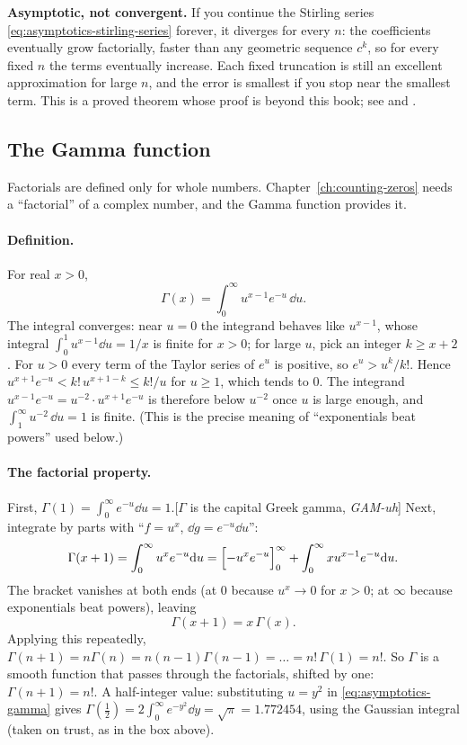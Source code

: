 \begin{beyond}
\textbf{Asymptotic, not convergent.} If you continue the Stirling series \cref{eq:asymptotics-stirling-series} forever, it diverges for every $n$: the coefficients eventually grow factorially, faster than any geometric sequence $c^k$, so for every fixed $n$ the terms eventually increase. Each fixed truncation is still an excellent approximation for large $n$, and the error is smallest if you stop near the smallest term. This is a proved theorem whose proof is beyond this book; see \cite{edwards} and \cite{rhb}.
\end{beyond}

\subsection{The Gamma function}

Factorials are defined only for whole numbers. Chapter~\ref{ch:counting-zeros} needs a ``factorial'' of a complex number, and the Gamma function provides it.

\paragraph{Definition.} For real $x>0$,
\begin{equation}
\Gamma(x)=\int_0^\infty u^{x-1}e^{-u}\,\dd u .
\label{eq:asymptotics-gamma}
\end{equation}
The integral converges: near $u=0$ the integrand behaves like $u^{x-1}$, whose integral $\int_0^1u^{x-1}\dd u=1/x$ is finite for $x>0$; for large $u$, pick an integer $k\ge x+2$. For $u>0$ every term of the Taylor series of $e^u$ is positive, so $e^u>u^k/k!$. Hence $u^{x+1}e^{-u}<k!\,u^{x+1-k}\le k!/u$ for $u\ge1$, which tends to $0$. The integrand $u^{x-1}e^{-u}=u^{-2}\cdot u^{x+1}e^{-u}$ is therefore below $u^{-2}$ once $u$ is large enough, and $\int_1^\infty u^{-2}\,\dd u=1$ is finite. (This is the precise meaning of ``exponentials beat powers'' used below.)

\paragraph{The factorial property.} First, $\Gamma(1)=\int_0^\infty e^{-u}\dd u=1$.[$\Gamma$ is the capital Greek gamma, \emph{GAM-uh}] Next, integrate by parts with ``$f=u^{x}$, $\dd g=e^{-u}\dd u$'':
\[
\Gamma(x+1)=\int_0^\infty u^{x}e^{-u}\mathrm{d} u=\Bigl[-u^{x}e^{-u}\Bigr]_0^\infty+\int_0^\infty xu^{x-1}e^{-u}\mathrm{d} u .
\]
The bracket vanishes at both ends (at $0$ because $u^x\to0$ for $x>0$; at $\infty$ because exponentials beat powers), leaving
\begin{equation}
\Gamma(x+1)=x\,\Gamma(x).
\label{eq:asymptotics-gamma-rec}
\end{equation}
Applying this repeatedly, $\Gamma(n+1)=n\Gamma(n)=n(n-1)\Gamma(n-1)=\dots=n!\,\Gamma(1)=n!$. So $\Gamma$ is a smooth function that passes through the factorials, shifted by one: $\Gamma(n+1)=n!$. A half-integer value: substituting $u=y^2$ in \cref{eq:asymptotics-gamma} gives $\Gamma(\tfrac12)=2\int_0^\infty e^{-y^2}\dd y=\sqrt\pi=1.772454$, using the Gaussian integral (taken on trust, as in the box above).

